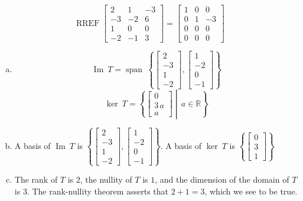 \begin{exerciseAnswer} 


\[\operatorname{RREF} \left[\begin{array}{ccc}
2 & 1 & -3 \\
-3 & -2 & 6 \\
1 & 0 & 0 \\
-2 & -1 & 3
\end{array}\right] = \left[\begin{array}{ccc}
1 & 0 & 0 \\
0 & 1 & -3 \\
0 & 0 & 0 \\
0 & 0 & 0
\end{array}\right] \]


\begin{enumerate}[(a)]
\item \[\operatorname{Im}\ T = \operatorname{span}\  \left\{ \left[\begin{array}{c}
2 \\
-3 \\
1 \\
-2
\end{array}\right] , \left[\begin{array}{c}
1 \\
-2 \\
0 \\
-1
\end{array}\right] \right\} \]\[\operatorname{ker}\ T =  \left\{ \left[\begin{array}{c}
0 \\
3 \, a \\
a
\end{array}\right] \middle|\,a\in\mathbb{R}\right\} \]
\item  A basis of \(\operatorname{Im}\ T\) is \( \left\{ \left[\begin{array}{c}
2 \\
-3 \\
1 \\
-2
\end{array}\right] , \left[\begin{array}{c}
1 \\
-2 \\
0 \\
-1
\end{array}\right] \right\} \). A basis of \(\operatorname{ker}\ T\) is \( \left\{ \left[\begin{array}{c}
0 \\
3 \\
1
\end{array}\right] \right\} \)
\item  The rank of \(T\) is \( 2 \), the nullity of \(T\) is \( 1 \), and the dimension of the domain of \(T\) is \( 3 \). The rank-nullity theorem asserts that \( 2 + 1 = 3 \), which we see to be true. 
\end{enumerate}
    
\end{exerciseAnswer}
    
